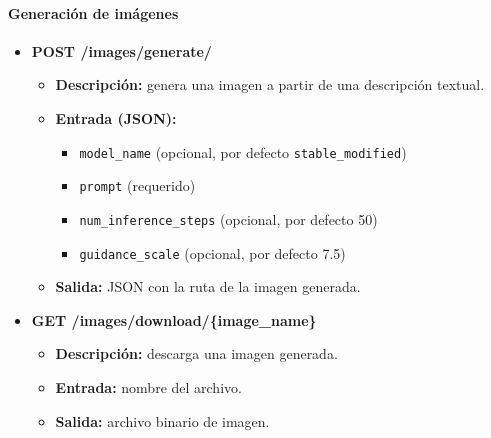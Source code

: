 \paragraph{Generación de imágenes}
\begin{itemize}
    \item \textbf{POST /images/generate/}
    \begin{itemize}
        \item \textbf{Descripción:} genera una imagen a partir de una descripción textual.
        \item \textbf{Entrada (JSON):}
            \begin{itemize}
                \item \texttt{model\_name} (opcional, por defecto \texttt{stable\_modified})
                \item \texttt{prompt} (requerido)
                \item \texttt{num\_inference\_steps} (opcional, por defecto 50)
                \item \texttt{guidance\_scale} (opcional, por defecto 7.5)
            \end{itemize}
        \item \textbf{Salida:} JSON con la ruta de la imagen generada.
    \end{itemize}

    \item \textbf{GET /images/download/\{image\_name\}}
    \begin{itemize}
        \item \textbf{Descripción:} descarga una imagen generada.
        \item \textbf{Entrada:} nombre del archivo.
        \item \textbf{Salida:} archivo binario de imagen.
    \end{itemize}
\end{itemize}


